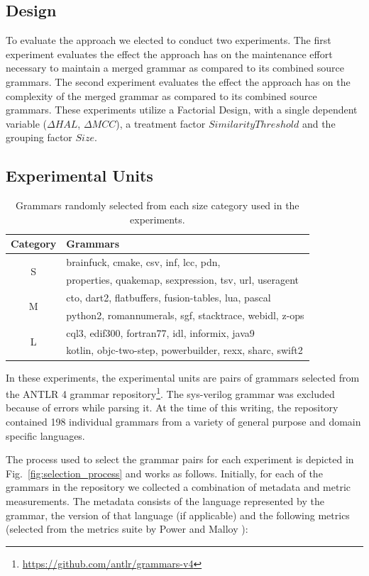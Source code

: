 \documentclass[conference]{IEEEtran}
\begin{document}
\hypertarget{sec:design}{%
\subsection{Design}\label{sec:design}}

To evaluate the approach we elected to conduct two experiments. The
first experiment evaluates the effect the approach has on the
maintenance effort necessary to maintain a merged grammar as compared to
its combined source grammars. The second experiment evaluates the effect
the approach has on the complexity of the merged grammar as compared to
its combined source grammars. These experiments utilize a Factorial
Design, with a single dependent variable (\(\Delta HAL\),
\(\Delta MCC\)), a treatment factor \(Similarity Threshold\) and the
grouping factor \(Size\).

\hypertarget{sec:subjects}{%
\subsection{Experimental Units}\label{sec:subjects}}

\begin{table}[tb]
\centering
\caption{Grammars randomly selected from each size category used in the experiments.}
\label{tbl:grammar_metrics}
\begin{tabular}{|c|l|}
\hline
Category & Grammars\tabularnewline
\hline
\hline
\multirow{2}{*}{S} & brainfuck, cmake, csv, inf, lcc, pdn,\tabularnewline
\cline{2-2}
 & properties, quakemap, sexpression, tsv, url, useragent\tabularnewline
\hline
\multirow{2}{*}{M} & cto, dart2, flatbuffers, fusion-tables, lua, pascal\tabularnewline
\cline{2-2}
 & python2, romannumerals, sgf, stacktrace, webidl, z-ops\tabularnewline
\hline
\multirow{2}{*}{L} & cql3, edif300, fortran77, idl, informix, java9\tabularnewline
\cline{2-2}
 & kotlin, objc-two-step, powerbuilder, rexx, sharc, swift2\tabularnewline
\hline
\end{tabular}
\end{table}

In these experiments, the experimental units are pairs of grammars
selected from the ANTLR 4 \cite{parrDefinitiveANTLRReference2012}
grammar repository\footnote{\url{https://github.com/antlr/grammars-v4}}.
The sys-verilog grammar was excluded because of errors while parsing it.
At the time of this writing, the repository contained 198 individual
grammars from a variety of general purpose and domain specific
languages.

The process used to select the grammar pairs for each experiment is
depicted in Fig.~\ref{fig:selection_process} and works as follows.
Initially, for each of the grammars in the repository we collected a
combination of metadata and metric measurements. The metadata consists
of the language represented by the grammar, the version of that language
(if applicable) and the following metrics (selected from the metrics
suite by Power and Malloy \cite{powerMetricsSuiteGrammarbased2004}):
\end{document}
